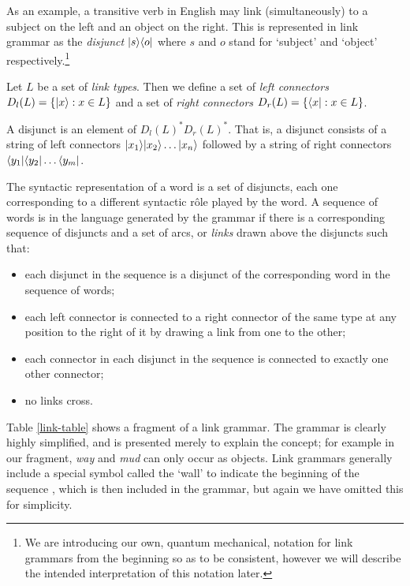 As an example, a transitive verb in English may link (simultaneously) to a subject on the left and an object on the right. This is represented in link grammar as the \emph{disjunct} $|s \rangle\langle o|$ where $s$ and $o$ stand for `subject' and `object' respectively.\footnote{We are introducing our own, quantum mechanical, notation for link grammars from the beginning so as to be consistent, however we will describe the intended interpretation of this notation later.}

\begin{defn}
Let $L$ be a set of \emph{link types}. Then we define a set of \emph{left connectors} $D_l(L) = \{|x \rangle : x \in L\}$ and a set of \emph{right connectors} $D_r(L) = \{\langle x| : x \in L\}$.

A disjunct is an element of $D_l(L)^*D_r(L)^*$. That is, a disjunct consists of a string of left connectors $|x_1 \rangle|x_2 \rangle\ldots|x_n \rangle$ followed by a string of right connectors $\langle y_1|\langle y_2|\ldots\langle y_m|$.

The syntactic representation of a word is a set of disjuncts, each one corresponding to a different syntactic r\^ole played by the word. A sequence of words is in the language generated by the grammar if there is a corresponding sequence of disjuncts and a set of arcs, or \emph{links} drawn above the disjuncts such that:
\begin{itemize}
\item each disjunct in the sequence is a disjunct of the corresponding word in the sequence of words;
\item each left connector is connected to a right connector of the same type at any position to the right of it by drawing a link from one to the other;
\item each connector in each disjunct in the sequence is connected to exactly one other connector;
\item no links cross.
\end{itemize}
\end{defn}

Table \ref{link-table} shows a fragment of a link grammar. The grammar is clearly highly simplified, and is presented merely to explain the concept; for example in our fragment, \emph{way} and \emph{mud} can only occur as objects. Link grammars generally include a special symbol called the `wall' to indicate the beginning of the sequence \citep{Sleator:91}, which is then included in the grammar, but again we have omitted this for simplicity.

